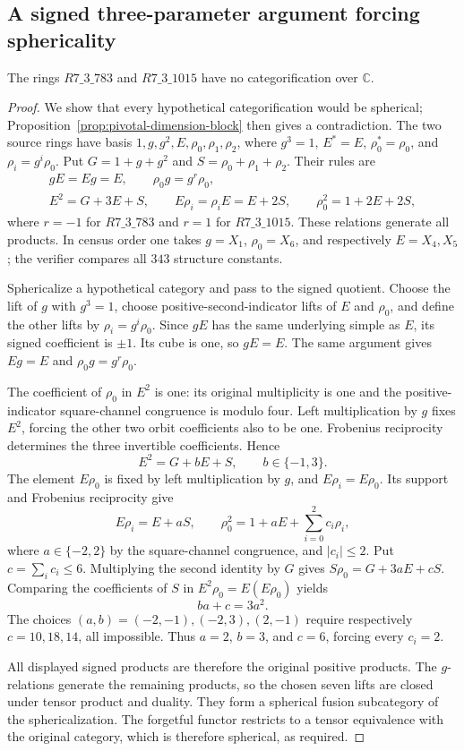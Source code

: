 \subsection{A signed three-parameter argument forcing sphericality}
\label{subsec:c3-signed-general}

\begin{proposition}\label{prop:c3-signed-general}
The rings $R7\_3\_783$ and $R7\_3\_1015$ have no categorification
over $\mathbb C$.
\end{proposition}
\begin{proof}
We show that every hypothetical categorification would be spherical;
Proposition~\ref{prop:pivotal-dimension-block} then gives a contradiction.
The two source rings have basis
$1,g,g^2,E,\rho_0,\rho_1,\rho_2$, where
$g^3=1$, $E^*=E$, $\rho_0^*=\rho_0$, and $\rho_i=g^i\rho_0$.
Put $G=1+g+g^2$ and $S=\rho_0+\rho_1+\rho_2$. Their rules are
\[
\begin{gathered}
 gE=Eg=E,\qquad \rho_0g=g^r\rho_0,\\
 E^2=G+3E+S,\qquad E\rho_i=\rho_iE=E+2S,
 \qquad \rho_0^2=1+2E+2S,
\end{gathered}
\]
where $r=-1$ for $R7\_3\_783$ and $r=1$ for $R7\_3\_1015$.
These relations generate all products. In census order one takes
$g=X_1$, $\rho_0=X_6$, and respectively $E=X_4,X_5$; the verifier
compares all $343$ structure constants.

Sphericalize a hypothetical category and pass to the signed quotient.
Choose the lift of $g$ with $g^3=1$, choose positive-second-indicator
lifts of $E$ and $\rho_0$, and define the other lifts by
$\rho_i=g^i\rho_0$. Since $gE$ has the same underlying simple as $E$,
its signed coefficient is $\pm1$. Its cube is one, so $gE=E$.
The same argument gives $Eg=E$ and
$\rho_0g=g^r\rho_0$.

The coefficient of $\rho_0$ in $E^2$ is one: its original multiplicity
is one and the positive-indicator square-channel congruence is modulo
four. Left multiplication by $g$ fixes $E^2$, forcing the other two
orbit coefficients also to be one. Frobenius reciprocity determines
the three invertible coefficients. Hence
\[
 E^2=G+bE+S,\qquad b\in\{-1,3\}.
\]
The element $E\rho_0$ is fixed by left multiplication by $g$, and
$E\rho_i=E\rho_0$. Its support and Frobenius reciprocity give
\[
 E\rho_i=E+aS,\qquad
 \rho_0^2=1+aE+\sum_{i=0}^2c_i\rho_i,
\]
where $a\in\{-2,2\}$ by the square-channel congruence, and
$|c_i|\leq2$. Put $c=\sum_i c_i\leq6$.
Multiplying the second identity by $G$ gives
$S\rho_0=G+3aE+cS$. Comparing the coefficients of $S$ in
$E^2\rho_0=E(E\rho_0)$ yields
\[
 ba+c=3a^2.
\]
The choices $(a,b)=(-2,-1),(-2,3),(2,-1)$ require respectively
$c=10,18,14$, all impossible. Thus $a=2$, $b=3$, and $c=6$,
forcing every $c_i=2$.

All displayed signed products are therefore the original positive
products. The $g$-relations generate the remaining products, so the
chosen seven lifts are closed under tensor product and duality. They
form a spherical fusion subcategory of the sphericalization. The
forgetful functor restricts to a tensor equivalence with the original
category, which is therefore spherical, as required.
\end{proof}

